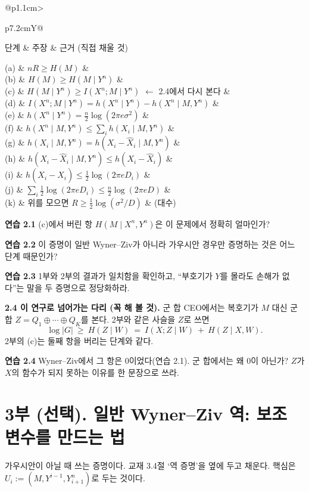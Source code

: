 \documentclass[11pt,a4paper]{article}
\makeatletter
\newcommand{\blank}{\rule[-0.3em]{0pt}{1.6em}}
\newcommand{\steptable}[1]{%
  \renewcommand{\arraystretch}{1.55}%
  \begin{tabularx}{\linewidth}{@{}p{1.1cm}>{\raggedright\arraybackslash}p{7.2cm}Y@{}}
  \toprule
  단계 & 주장 & 근거 (직접 채울 것)\\ \midrule
  #1
  \bottomrule
  \end{tabularx}}
\makeatother
\begin{document}
\steptable{
(a) & $nR\ge H(M)$ & \\
(b) & $H(M)\ge H(M\mid Y^n)$ & \\
(c) & $H(M\mid Y^n)\ge I(X^n;M\mid Y^n)$ \quad\textcolor{hot}{$\leftarrow$ 2.4에서 다시 본다} & \\
(d) & $I(X^n;M\mid Y^n)=h(X^n\mid Y^n)-h(X^n\mid M,Y^n)$ & \\
(e) & $h(X^n\mid Y^n)=\tfrac n2\log(2\pi e\sigma^2)$ & \\
(f) & $h(X^n\mid M,Y^n)\le\sum_i h(X_i\mid M,Y^n)$ & \\
(g) & $h(X_i\mid M,Y^n)=h(X_i-\hat X_i\mid M,Y^n)$ & \\
(h) & $h(X_i-\hat X_i\mid M,Y^n)\le h(X_i-\hat X_i)$ & \\
(i) & $h(X_i-\hat X_i)\le\tfrac12\log(2\pi e D_i)$ & \\
(j) & $\sum_i\tfrac12\log(2\pi e D_i)\le\tfrac n2\log(2\pi e D)$ & \\
(k) & 위를 모으면 $R\ge\tfrac12\log(\sigma^2/D)$ & (대수)\\
}

\textbf{연습 2.1} (c)에서 버린 항 $H(M\mid X^n,Y^n)$은 이 문제에서 정확히 얼마인가? \hfill\blank

\textbf{연습 2.2} 이 증명이 일반 Wyner–Ziv가 아니라 가우시안 경우만 증명하는 것은 어느 단계 때문인가? \hfill\blank

\textbf{연습 2.3} 1부와 2부의 결과가 일치함을 확인하고, “부호기가 $Y$를 몰라도 손해가 없다”는 말을 두 증명으로 정당화하라.

\vspace{3.5em}

\begin{bridge}
\textbf{2.4 이 연구로 넘어가는 다리 (꼭 해 볼 것).} 군 합 CEO에서는 복호기가 $M$ 대신 군 합 $Z=Q_1\oplus\cdots\oplus Q_K$를 본다. 2부와 같은 사슬을 $Z$로 쓰면
\[
\log|G|\ \ge\ H(Z\mid W)\ =\ I(X;Z\mid W)\ +\ H(Z\mid X,W).
\]
2부의 (c)는 둘째 항을 버리는 단계와 같다.

\textbf{연습 2.4} Wyner–Ziv에서 그 항은 0이었다(연습 2.1). 군 합에서는 왜 0이 아닌가? $Z$가 $X$의 함수가 되지 못하는 이유를 한 문장으로 쓰라.
\vspace{3em}
\end{bridge}

\section*{3부 (선택). 일반 Wyner–Ziv 역: 보조 변수를 만드는 법}

가우시안이 아닐 때 쓰는 증명이다. 교재 3.4절 ‘역 증명’을 옆에 두고 채운다. 핵심은 $U_i:=(M,Y^{i-1},Y_{i+1}^n)$로 두는 것이다.
\end{document}
